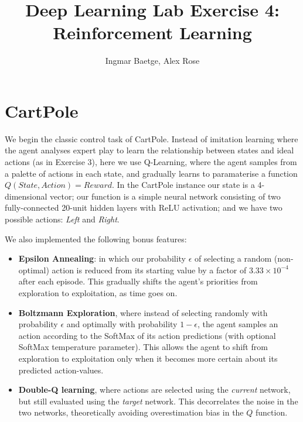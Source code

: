 \documentclass[a4paper, 11pt, conference]{ieeeconf}      %
\title{\LARGE \bf
Deep Learning Lab Exercise 4: Reinforcement Learning}
\author{Ingmar Baetge, Alex Rose}
\begin{document}

\maketitle


\section{CartPole}

We begin the classic control task of CartPole. Instead of imitation learning where the agent analyses expert play to learn the relationship between states and ideal actions (as in Exercise 3), here we use Q-Learning, where the agent samples from a palette of actions in each state, and gradually learns to paramaterise a function $Q(State, Action) = Reward$. In the CartPole instance our state is a 4-dimensional vector; our function is a simple neural network consisting of two fully-connected 20-unit hidden layers with ReLU activation; and we have two possible actions: \textit{Left} and \textit{Right}.

We also implemented the following bonus features:

\begin{itemize}
	\item \textbf{Epsilon Annealing}: in which our probability $\epsilon$ of selecting a random (non-optimal) action is reduced from its starting value by a factor of $3.33 \times 10^{-4}$ after each episode. This gradually shifts the agent's priorities from exploration to exploitation, as time goes on.

	\item \textbf{Boltzmann Exploration}, where instead of selecting randomly with probability $\epsilon$ and optimally with probability $1 - \epsilon$, the agent samples an action according to the SoftMax of its action predictions (with optional SoftMax temperature parameter). This allows the agent to shift from exploration to exploitation only when it becomes more certain about its predicted action-values.

	\item \textbf{Double-Q learning}, where actions are selected using the \textit{current} network, but still evaluated using the \textit{target} network. This decorrelates the noise in the two networks, theoretically avoiding overestimation bias in the $Q$ function.

\end{itemize}
\end{document}

